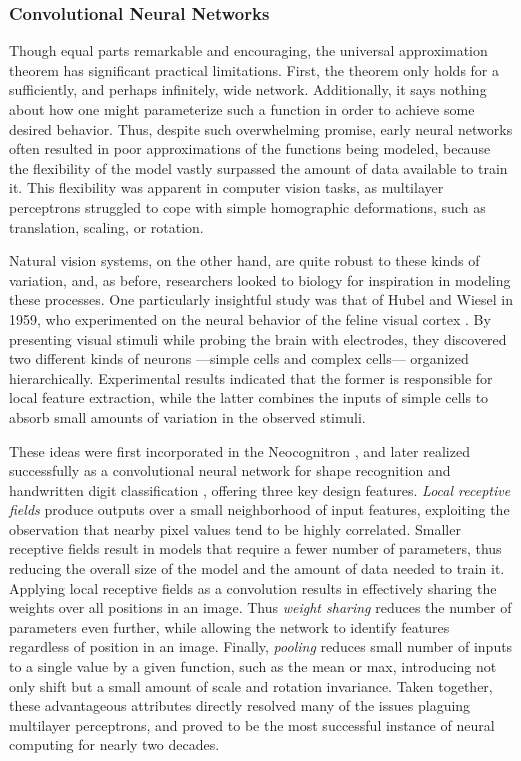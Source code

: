 \subsubsection{Convolutional Neural Networks}
\label{subsec:convnets}


Though equal parts remarkable and encouraging, the universal approximation theorem has significant practical limitations.
First, the theorem only holds for a sufficiently, and perhaps infinitely, wide network.
Additionally, it says nothing about how one might parameterize such a function in order to achieve some desired behavior.
Thus, despite such overwhelming promise, early neural networks often resulted in poor approximations of the functions being modeled, because the flexibility of the model vastly surpassed the amount of data available to train it.
This flexibility was apparent in computer vision tasks, as multilayer perceptrons struggled to cope with simple homographic deformations, such as translation, scaling, or rotation.

Natural vision systems, on the other hand, are quite robust to these kinds of variation, and, as before, researchers looked to biology for inspiration in modeling these processes.
One particularly insightful study was that of Hubel and Wiesel in 1959, who experimented on the neural behavior of the feline visual cortex \cite{Hubel1959Receptive}.
By presenting visual stimuli while probing the brain with electrodes, they discovered two different kinds of neurons ---simple cells and complex cells--- organized hierarchically.
Experimental results indicated that the former is responsible for local feature extraction, while the latter combines the inputs of simple cells to absorb small amounts of variation in the observed stimuli.

These ideas were first incorporated in the Neocognitron \cite{Fukushima1988Neocognitron}, and later realized successfully as a convolutional neural network for shape recognition and handwritten digit classification \cite{LeCun1998Gradient}, offering three key design features.
\emph{Local receptive fields} produce outputs over a small neighborhood of input features, exploiting the observation that nearby pixel values tend to be highly correlated.
Smaller receptive fields result in models that require a fewer number of parameters, thus reducing the overall size of the model and the amount of data needed to train it.
Applying local receptive fields as a convolution results in effectively sharing the weights over all positions in an image.
Thus \emph{weight sharing} reduces the number of parameters even further, while allowing the network to identify features regardless of position in an image.
Finally, \emph{pooling} reduces small number of inputs to a single value by a given function, such as the mean or max, introducing not only shift but a small amount of scale and rotation invariance.
Taken together, these advantageous attributes directly resolved many of the issues plaguing multilayer perceptrons, and proved to be the most successful instance of neural computing for nearly two decades.


